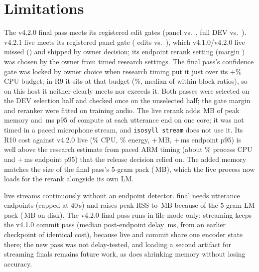 \section{Limitations}\label{sec:limitations}

 The v4.2.0 final pass meets its registered edit gates (panel \FinPanelEdits{} vs.\
\CandGateFinalPanel, full DEV \FinFullEdits{} vs.\ \CandGateFinalFull). v4.2.1 live meets its registered panel gate (\LivPanelEdits{} edits vs.\ \CandGateLivePanel), which v4.1.0/v4.2.0
live missed (\LookLivePanelEdits) and shipped by owner decision; its endpoint rerank setting (margin \LivSkipMargin) was chosen by
the owner from timed research settings. The final pass's confidence gate
was locked by owner choice when research timing put it just over its +\FinGateBudgetPct\% CPU budget; in R9 it sits at that
budget (\FinGateCpuPct\%, median of within-block ratios), so on this host it neither clearly meets nor exceeds it. Both passes were selected on
the DEV selection half and checked once on the unselected half; the gate margin and reranker were fitted on training audio.
The live rerank adds \LivCostRssMb\,MB of peak memory and \LivDelayPNinetyFive\,ms p95 of compute at each utterance end on one
core; it was not timed in a paced microphone stream, and \texttt{isosyll stream} does not use it. Its R10 cost
against v4.2.0 live (\LivCostCpuPct\% CPU, \LivCostEnergyPct\% energy, +\LivCostRssMb\,MB, +\LivDelayPNinetyFive\,ms endpoint p95) is well above
the research estimate from paced ARM timing (about \LivResCpuPct\% process CPU and +\LivResEndpointPNinetyFive\,ms endpoint p95) that the
release decision relied on. The added memory matches the size of the final pass's 5-gram pack (\LmPackMb\,MB), which the live process now loads
for the rerank alongside its own LM.

 \ultra{} live streams continuously without an endpoint
detector. \ultra{} final needs utterance endpoints (capped at 40\,s) and raises peak RSS to \ColdHeadRss\,MB because of the
5-gram LM pack (\LmPackMb\,MB on disk). The v4.2.0 final pass runs in file mode only: streaming keeps the v4.1.0
commit pass (median post-endpoint delay \RelCommitDelayPfifty\,ms, from an earlier checkpoint of identical cost),
because live and commit share one encoder state there; the new pass was not delay-tested, and loading a second
artifact for streaming finals remains future work, as does shrinking memory without losing accuracy.

